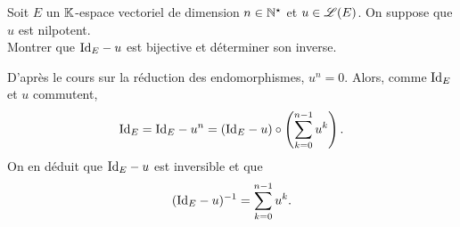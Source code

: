 \begin{exercice}
    Soit $E$ un $\mathbb{K}$-espace vectoriel de dimension $n \in \mathbb{N}^\star$ et $u \in \mathscr{L}(E)$. On suppose que $u$ est nilpotent. \\
    Montrer que $\mathrm{Id}_E - u$ est bijective et déterminer son inverse.
\end{exercice}


\begin{solution}
    D'après le cours sur la réduction des endomorphismes, $u^n = 0$. Alors, comme $\mathrm{Id}_E$ et $u$ commutent, 
    $$\mathrm{Id}_E = \mathrm{Id}_E - u^n = (\mathrm{Id}_E - u) \circ \left( \sum_{k = 0}^{n-1} u^k \right).$$
    On en déduit que $\mathrm{Id}_E - u$ est inversible et que 
    $$(\mathrm{Id}_E - u)^{-1} = \sum_{k = 0}^{n-1} u^k.$$
\end{solution}